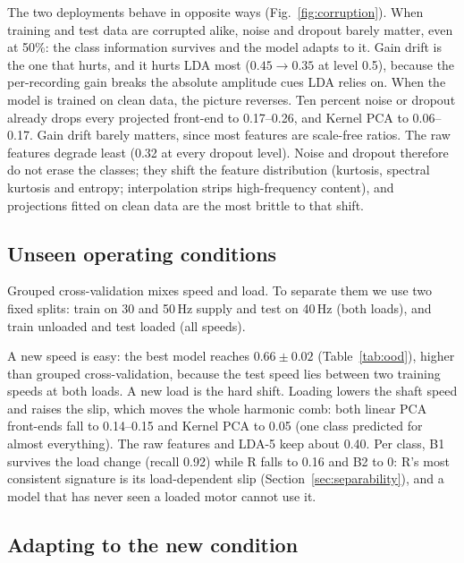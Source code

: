 The two deployments behave in opposite ways (Fig.~\ref{fig:corruption}). When training and test
data are corrupted alike, noise and dropout barely matter, even at 50\%: the class information
survives and the model adapts to it. Gain drift is the one that hurts, and it hurts LDA most
($0.45 \to 0.35$ at level 0.5), because the per-recording gain breaks the absolute amplitude
cues LDA relies on. When the model is trained on clean data, the picture reverses. Ten percent
noise or dropout already drops every projected front-end to 0.17--0.26, and Kernel PCA to
0.06--0.17. Gain drift barely matters, since most features are scale-free ratios. The raw
features degrade least (0.32 at every dropout level). Noise and dropout therefore do not erase
the classes; they shift the feature distribution (kurtosis, spectral kurtosis and entropy;
interpolation strips high-frequency content), and projections fitted on clean data are the most
brittle to that shift.

\subsection{Unseen operating conditions}

Grouped cross-validation mixes speed and load. To separate them we use two fixed splits: train on
30 and 50\,Hz supply and test on 40\,Hz (both loads), and train unloaded and test loaded (all
speeds).

\begin{table}[t]
  \centering
  \caption{Out-of-distribution splits: best classifier per front-end (macro-F1, mean $\pm$ std
  over 5 seeds).}
  \label{tab:ood}
  \resizebox{\columnwidth}{!}{}
\end{table}

A new speed is easy: the best model reaches $0.66 \pm 0.02$ (Table~\ref{tab:ood}), higher than
grouped cross-validation, because the test speed lies between two training speeds at both loads.
A new load is the hard shift. Loading lowers the shaft speed and raises the slip, which moves the
whole harmonic comb: both linear PCA front-ends fall to 0.14--0.15 and Kernel PCA to 0.05
(one class predicted for almost everything). The raw features and LDA-5 keep about 0.40. Per class, B1 survives the load
change (recall 0.92) while R falls to 0.16 and B2 to 0: R's most consistent signature is its
load-dependent slip (Section~\ref{sec:separability}), and a model that has never seen a loaded
motor cannot use it.

\subsection{Adapting to the new condition}

